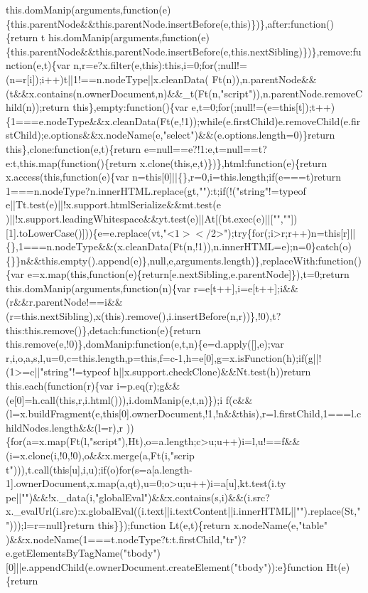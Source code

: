 \begin{DoxyCode}
{       this.domManip(arguments,function(e)\{this.parentNode&&this.parentNode.insertBefore(e,this)\})\},after:function()\{return
       t
      his.domManip(arguments,function(e)\{this.parentNode&&this.parentNode.insertBefore(e,this.nextSibling)\})\},remove:function(e,t)\{var
       n,r=e?x.filter(e,this):this,i=0;for(;null!=(n=r[i]);i++)t||1!==n.nodeType||x.cleanData(
      Ft(n)),n.parentNode&&(t&&x.contains(n.ownerDocument,n)&&\_t(Ft(n,"script")),n.parentNode.removeChild(n));return this\},empty:function()\{var
       e,t=0;for(;null!=(e=this[t]);t++)\{1===e.nodeType&&x.cleanData(Ft(e,!1));while(e.firstChild)e.removeChild(e.firstChild);e.options&&x.nodeName(e,"select")&&(e.options.length=0)\}return
       this\},clone:function(e,t)\{return e=null==e?!1:e,t=null==t?e:t,this.map(function()\{return
       x.clone(this,e,t)\})\},html:function(e)\{return x.access(this,function(e)\{var n=this[0]||\{\},r=0,i=this.length;if(e===t)return
       1===n.nodeType?n.innerHTML.replace(gt,""):t;if(!("string"!=typeof
       e||Tt.test(e)||!x.support.htmlSerialize&&mt.test(e
      )||!x.support.leadingWhitespace&&yt.test(e)||At[(bt.exec(e)||["",""])[1].toLowerCase()]))\{e=e.replace(vt,"<$
      1></$2>");try\{for(;i>r;r++)n=this[r]||\{\},1===n.nodeType&&(x.cleanData(Ft(n,!1)),n.innerHTML=e);n=0\}catch(o)\{\}\}n&&this.empty().append(e)\},null,e,arguments.length)\},replaceWith:function()\{var
       e=x.map(this,function(e)\{return[e.nextSibling,e.parentNode]\}),t=0;return this.domManip(arguments,function(n)\{var
       r=e[t++],i=e[t++];i&&
      (r&&r.parentNode!==i&&(r=this.nextSibling),x(this).remove(),i.insertBefore(n,r))\},!0),t?this:this.remove()\},detach:function(e)\{return this.remove(e,!0)\},domManip:function(e,t,n)\{e=d.apply([],e);var
       r,i,o,a,s,l,u=0,c=this.length,p=this,f=c-1,h=e[0],g=x.isFunction(h);if(g||!(1>=c||"string"!=typeof
       h||x.support.checkClone)&&Nt.test(h))return this.each(function(r)\{var
       i=p.eq(r);g&&(e[0]=h.call(this,r,i.html())),i.domManip(e,t,n)\});i
      f(c&&(l=x.buildFragment(e,this[0].ownerDocument,!1,!n&&this),r=l.firstChild,1===l.childNodes.length&&(l=r),r
      ))\{for(a=x.map(Ft(l,"script"),Ht),o=a.length;c>u;u++)i=l,u!==f&&(i=x.clone(i,!0,!0),o&&x.merge(a,Ft(i,"scrip
      t"))),t.call(this[u],i,u);if(o)for(s=a[a.length-1].ownerDocument,x.map(a,qt),u=0;o>u;u++)i=a[u],kt.test(i.ty
      pe||"")&&!x.\_data(i,"globalEval")&&x.contains(s,i)&&(i.src?x.\_evalUrl(i.src):x.globalEval((i.text||i.textContent||i.innerHTML||"").replace(St,"")));l=r=null\}return this\}\});function Lt(e,t)\{return
       x.nodeName(e,"table"
      )&&x.nodeName(1===t.nodeType?t:t.firstChild,"tr")?e.getElementsByTagName("tbody")[0]||e.appendChild(e.ownerDocument.createElement("tbody")):e\}function Ht(e)\{return
}
\end{DoxyCode}
